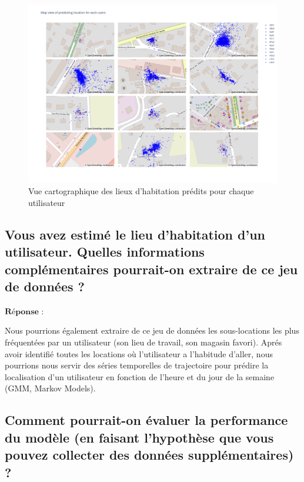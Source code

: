\documentclass[10pt,a4paper]{article}
\begin{document}
\begin{figure}[H]
    \includegraphics[scale=0.25]{map_prediction.png}
    \centering
    \caption{Vue cartographique des lieux d'habitation prédits pour chaque utilisateur}
    \label{fig:figure15}
\end{figure}


\subsection{Vous avez estimé le lieu d'habitation d'un utilisateur. Quelles informations complémentaires pourrait-on extraire de ce jeu de données ?}

\vspace{5mm}
$\textbf{Réponse : }$
\vspace{5mm}

Nous pourrions également extraire de ce jeu de données les sous-locations les plus fréquentées par un utilisateur (son lieu de travail, son magasin favori).
Aprés avoir identifié toutes les locations où l'utilisateur a l'habitude d'aller, nous pourrions nous servir des séries temporelles de trajectoire pour prédire
la localisation d'un utilisateur en fonction de l'heure et du jour de la semaine (GMM, Markov Models).


\vspace{5mm}

\subsection{Comment pourrait-on évaluer la performance du modèle (en faisant l'hypothèse que vous pouvez collecter des données supplémentaires) ?}
\end{document}
